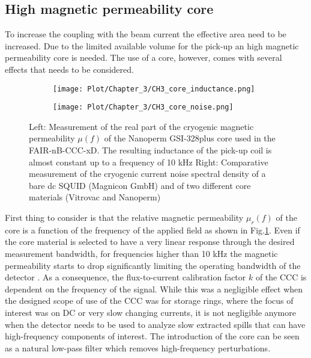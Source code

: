 \documentclass[12pt,a4paper]{report}
\begin{document}
       \subsection{High magnetic permeability core}
       To increase the coupling with the beam current the effective area need to be increased. Due to the limited available volume for the pick-up an high magnetic permeability core is needed. The use of a core, however, comes with several effects that needs to be considered.
       \begin{figure}[H]
       	\centering
       	\begin{subfigure}[b]{0.48\textwidth}
       		\centering
       		\texttt{[image: Plot/Chapter\_3/CH3\_core\_inductance.png]}
       	\end{subfigure}
       	\hfill
       	\begin{subfigure}[b]{0.45\textwidth}
       		\centering
       		\texttt{[image: Plot/Chapter\_3/CH3\_core\_noise.png]}
       	\end{subfigure}
       	\caption{\small{Left: Measurement of the real part of the cryogenic magnetic permeability $\mu(f)$ of the Nanoperm GSI-328plus core used in the FAIR-nB-CCC-xD. The resulting inductance of the pick-up coil is almost constant up to a frequency of 10 kHz \cite{Tympel:IBIC2016} Right: Comparative measurement of the cryogenic current noise spectral density of a bare dc SQUID (Magnicon GmbH) and of two different core materials (Vitrovac and Nanoperm) \cite{Geithner_core}}}
       	\label{CH3_core}
       \end{figure}
       First thing to consider is that the relative magnetic permeability $\mu_r(f)$ of the core is a function of the frequency of the applied field as shown in Fig.\ref{CH3_core}. Even if the core material is selected to have a very linear response through the desired measurement bandwidth, for frequencies higher than 10 kHz the magnetic permeability starts to drop significantly limiting the operating bandwidth of the detector \cite{Geithner_core}. As a consequence, the flux-to-current calibration factor \(k\) of the CCC is dependent on the frequency of the signal. While this was a negligible effect when the designed scope of use of the CCC was for storage rings, where the focus of interest was on DC or very slow changing currents, it is not negligible anymore when the detector needs to be used to analyze slow extracted spills that can have high-frequency components of interest. The introduction of the core can be seen as a natural low-pass filter which removes high-frequency perturbations. \\
\end{document}
